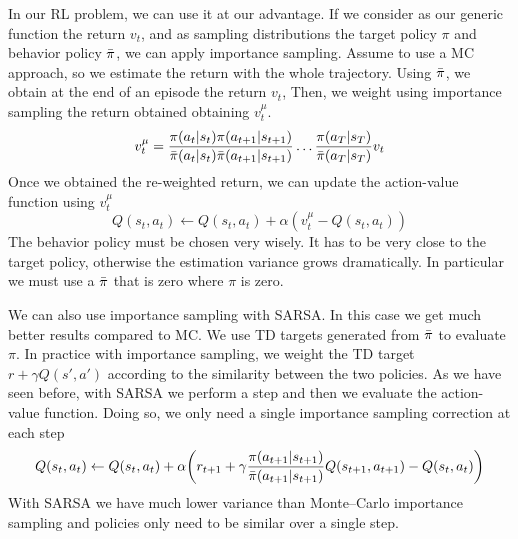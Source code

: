 \documentclass[main.tex]{subfiles}
\begin{document}
In our RL problem, we can use it at our advantage. If we consider as our generic function the return $v_t$, and as sampling distributions the target policy $\pi$ and behavior policy $\Bar{\pi}$, we can apply importance sampling\footnotemark. Assume to use a MC approach, so we estimate the return with the whole trajectory. Using $\Bar{\pi}$, we obtain at the end of an episode the return $v_t$, Then, we weight using importance sampling the return obtained obtaining $v_t^{\mu}$.
\begin{equation}
    v_t^{\mu} = \frac{\pi(a_t|s_t) \pi(a_{t+1}|s_{t+1})}{\Bar{\pi}(a_t|s_t) \Bar{\pi}(a_{t+1}|s_{t+1})} \dots \frac{\pi(a_T|s_T)}{\Bar{\pi}(a_T|s_T)} v_t
\end{equation}
Once we obtained the re-weighted return, we can update the action-value function using $v_t^{\mu}$
\begin{equation}
    Q(s_t,a_t) \leftarrow Q(s_t,a_t) + \alpha(v_t^{\mu} - Q(s_t,a_t))
\end{equation}
The behavior policy must be chosen very wisely. It has to be very close to the target policy, otherwise the estimation variance grows dramatically. In particular we must use a $\Bar{\pi}$ that is zero where $\pi$ is zero.

We can also use importance sampling with SARSA. In this case we get much better results compared to MC.
We use TD targets generated from $\Bar{\pi}$ to evaluate $\pi$. In practice with importance sampling, we weight the TD target $r+ \gamma Q(s',a')$ according to the similarity between the two policies. As we have seen before, with SARSA we perform a step and then we evaluate the action-value function. Doing so, we only need a single importance sampling correction at each step
\begin{equation}
    Q(s_t,a_t) \leftarrow Q(s_t,a_t) + \alpha \bigg( r_{t+1}+ \gamma \frac{\pi(a_{t+1}|s_{t+1})}{\Bar{\pi}(a_{t+1}|s_{t+1})} Q(s_{t+1},a_{t+1}) - Q(s_t,a_t) \bigg)
\end{equation}
With SARSA we have much lower variance than Monte–Carlo importance sampling and policies only need to be similar over a single step.
\newpage
\end{document}

